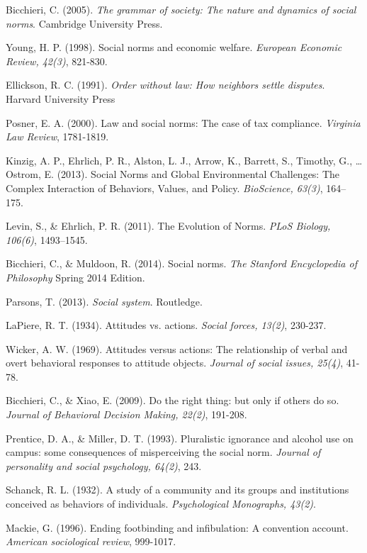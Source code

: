 \documentclass[rutwik_proposal.tex]{subfiles}
\begin{document}
\begin{thebibliography}{100}
Bicchieri, C. 
(2005). 
\emph{The grammar of society: The nature and dynamics of social norms}. 
Cambridge University Press.

Young, H. P. 
(1998). 
Social norms and economic welfare. 
\emph{European Economic Review, 42(3)}, 
821-830.

Ellickson, R. C.
(1991).
\emph{Order without law: How neighbors settle disputes}.
Harvard University Press

Posner, E. A. 
(2000). 
Law and social norms: The case of tax compliance. 
\emph{Virginia Law Review}, 
1781-1819.

Kinzig, A. P., Ehrlich, P. R., Alston, L. J., Arrow, K., Barrett, S., Timothy, G., … Ostrom, E. 
(2013). 
Social Norms and Global Environmental Challenges: The Complex Interaction of Behaviors, Values, and Policy. 
\emph{BioScience, 63(3)}, 
164–175.

Levin, S., \& Ehrlich, P. R. 
(2011). 
The Evolution of Norms. 
\emph{PLoS Biology, 106(6)}, 
1493–1545.

Bicchieri, C., \& Muldoon, R.
(2014).
Social norms.
\emph{The Stanford Encyclopedia of Philosophy}
Spring 2014 Edition.

Parsons, T. 
(2013). 
\emph{Social system}. 
Routledge.

LaPiere, R. T. 
(1934). 
Attitudes vs. actions. 
\emph{Social forces, 13(2)}, 
230-237.

Wicker, A. W. 
(1969). 
Attitudes versus actions: The relationship of verbal and overt behavioral responses to attitude objects. 
\emph{Journal of social issues, 25(4)}, 
41-78.

Bicchieri, C., \& Xiao, E. 
(2009). 
Do the right thing: but only if others do so. 
\emph{Journal of Behavioral Decision Making, 22(2)}, 
191-208.

Prentice, D. A., \& Miller, D. T. 
(1993). 
Pluralistic ignorance and alcohol use on campus: some consequences of misperceiving the social norm. 
\emph{Journal of personality and social psychology, 64(2)}, 
243.

Schanck, R. L. 
(1932). 
A study of a community and its groups and institutions conceived as behaviors of individuals. 
\emph{Psychological Monographs, 43(2)}.

Mackie, G. 
(1996). 
Ending footbinding and infibulation: A convention account. 
\emph{American sociological review}, 
999-1017.

\end{thebibliography}
\end{document}
